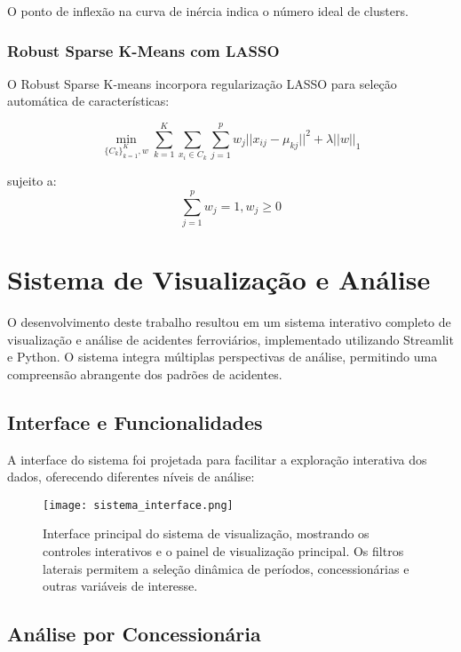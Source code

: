 \documentclass[conference]{IEEEtran}
\begin{document}
O ponto de inflexão na curva de inércia indica o número ideal de clusters.

\subsubsection{Robust Sparse K-Means com LASSO}
O Robust Sparse K-means \cite{b2} incorpora regularização LASSO para seleção automática de características:

\begin{equation}
\min_{\{C_k\}_{k=1}^K, w} \sum_{k=1}^K \sum_{x_i \in C_k} \sum_{j=1}^p w_j||x_{ij} - \mu_{kj}||^2 + \lambda||w||_1
\end{equation}

sujeito a:
\begin{equation}
\sum_{j=1}^p w_j = 1, w_j \geq 0
\end{equation}

\section{Sistema de Visualização e Análise}

O desenvolvimento deste trabalho resultou em um sistema interativo completo de visualização e análise de acidentes ferroviários, implementado utilizando Streamlit e Python. O sistema integra múltiplas perspectivas de análise, permitindo uma compreensão abrangente dos padrões de acidentes.

\subsection{Interface e Funcionalidades}

A interface do sistema foi projetada para facilitar a exploração interativa dos dados, oferecendo diferentes níveis de análise:

\begin{figure}[!htb]
    \centering
    \texttt{[image: sistema\_interface.png]}
    \caption{Interface principal do sistema de visualização, mostrando os controles interativos e o painel de visualização principal. Os filtros laterais permitem a seleção dinâmica de períodos, concessionárias e outras variáveis de interesse.}
    \label{fig:sistema_interface}
\end{figure}

\subsection{Análise por Concessionária}
\end{document}
